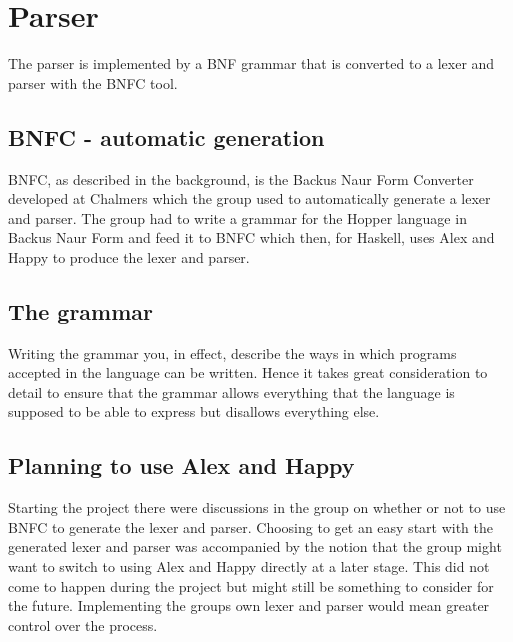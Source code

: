 \section{Parser}




The parser is implemented by a BNF grammar that is converted to a lexer and 
parser with the BNFC tool. 

\subsection{BNFC - automatic generation}

BNFC, as described in the background, is the Backus Naur Form Converter developed at Chalmers which the group used to automatically generate a lexer and parser. The group had to write a grammar for the Hopper language in Backus Naur Form and feed it to BNFC which then, for Haskell, uses Alex and Happy to produce the lexer and parser.

\subsection{The grammar}

Writing the grammar you, in effect, describe the ways in which programs accepted in the language can be written. Hence it takes great consideration to detail to ensure that the grammar allows everything that the language is supposed to be able to express but disallows everything else.


\subsection{Planning to use Alex and Happy}

Starting the project there were discussions in the group on whether or not to use BNFC to generate the lexer and parser. Choosing to get an easy start with the generated lexer and parser was accompanied by the notion that the group might want to switch to using Alex and Happy directly at a later stage. This did not come to happen during the project but might still be something to consider for the future. Implementing the groups own lexer and parser would mean greater control over the process.


